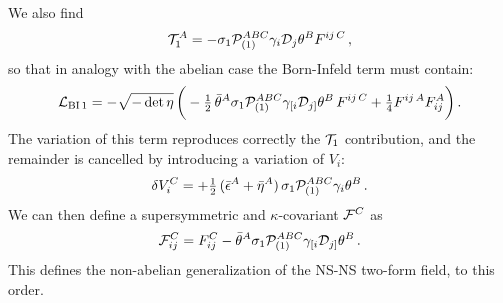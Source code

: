 \documentclass[12pt,a4paper]{article}
\def\half{{\textstyle {1 \over 2}}}
\def\noverm#1#2{{\textstyle {#1 \over #2}}}
\def\Dpartial{{\cal D}}
\begin{document}
We also find
\begin{equation}
  {\cal T}_1^A = -\sigma_1{\cal P}_{(1)}^{ABC}
   \gamma_i\Dpartial_j\theta^B F^{ij\,C}\,,
\end{equation}
so that
in analogy with the abelian case the Born-Infeld term must
contain:
\begin{equation}
\label{LBI1nab}
   {\cal L}_{{\rm BI\,1}} =   - \sqrt{-\det\eta}\,\bigg(
   - \half\, \bar\theta^A \sigma_1 {\cal P}_{(1)}^{ABC}
       \gamma_{[i}\Dpartial_{j]}\theta^B\, F^{ij\,C}
      + \noverm{1}{4} F^{ij\,A} F_{ij}^A \bigg)\,.
\end{equation}
The variation of this term reproduces correctly the ${\cal T}_1$
contribution, and the remainder is cancelled by introducing
a variation of $V_i$:
\begin{equation}
   \delta V_i^C = + \half\,(\bar\epsilon^A+\bar\eta^A)\,
           \sigma_1{\cal P}_{(1)}^{ABC}\gamma_i\theta^B \,.
\end{equation}
We can then define a supersymmetric and $\kappa$-covariant
${\cal F}^C$ as
\begin{equation}
\label{calF}
  {\cal F}_{ij}^C = F_{ij}^C - \bar\theta^A \sigma_1 {\cal P}_{(1)}^{ABC}
                 \gamma_{[i}\Dpartial_{j]}\theta^B\,.
\end{equation}
This defines the non-abelian generalization of the NS-NS two-form field,
to this order.
\end{document}
